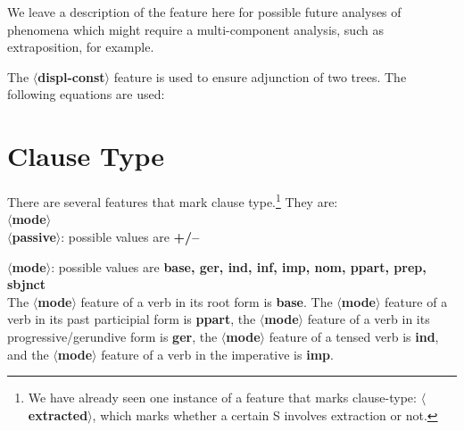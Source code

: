 We leave a description of the feature here for possible future analyses of
phenomena which might require a multi-component analysis, such as
extraposition, for example. 

%
The {\bf $\langle$displ-const$\rangle$} feature is used to ensure
adjunction of two trees.
The following equations are used:



\section{Clause Type}
There are several features that mark clause type.\footnote{We have
already seen one instance of a feature that marks clause-type: {\bf
$\langle$extracted$\rangle$}, which marks whether a certain S involves
extraction or not.} They are:\\ {\bf $\langle$mode$\rangle$}\\ 
{\bf $\langle$passive$\rangle$}: possible values are {\bf +/--}

\noindent
{\bf $\langle$mode$\rangle$}: possible values are 
{\bf base, ger, ind, inf, imp, nom, ppart, prep, sbjnct}\\
The {\bf $\langle$mode$\rangle$} feature of a verb in its root form is
{\bf base}. The {\bf $\langle$mode$\rangle$} feature of a verb in its past 
participial form is {\bf ppart}, the {\bf $\langle$mode$\rangle$} feature of a 
verb in its progressive/gerundive form is {\bf ger}, 
the {\bf $\langle$mode$\rangle$} feature of a tensed verb is {\bf ind},
and the {\bf $\langle$mode$\rangle$} feature of a verb in the imperative 
is {\bf imp}. 

